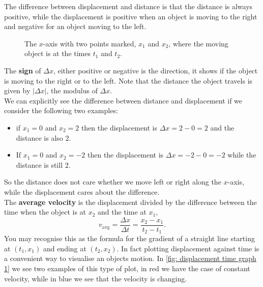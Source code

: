 The difference between displacement and distance is that the distance is always positive, while the displacement is positive when an object is moving to the right and negative for an object moving to the left.\\

\begin{figure}[ht]
    \centering
    \caption{The $x$-axis with two points marked, $x_{1}$ and $x_{2}$, where the moving object is at the times $t_{1}$ and $t_{2}$.}
    \label{fig: x-axis fig2}
\end{figure}

The \textbf{sign} of $\Delta x$, either positive or negative is the direction, it shows if the object is moving to the right or to the left. Note that the distance the object travels is given by $\vert \Delta x\vert$, the modulus of $\Delta x$.\\

We can explicitly see the difference between distance and displacement if we consider the following two examples:
\begin{itemize}
\setlength{\itemsep}{-5pt}
    \item if $x_{1}=0$ and $x_{2}=2$ then the displacement is $\Delta x=2-0=2$ and the distance is also $2$.
    \item If $x_{1}=0$ and $x_{2}=-2$ then the displacement is $\Delta x = -2-0=-2$ while the distance is still $2$.
\end{itemize}
So the distance does not care whether we move left or right along the $x$-axis, while the displacement cares about the difference.\\

The \textbf{average velocity} is the displacement divided by the difference between the time when the object is at $x_{2}$ and the time at $x_{1}$,
\begin{equation}
    v_{\text{avg}}=\frac{\Delta x}{\Delta t}=\frac{x_{2}-x_{1}}{t_{2}-t_{1}}.
    \label{eq: average velocity}
\end{equation}
You may recognise this as the formula for the gradient of a straight line starting at $(t_{1},x_{1})$ and ending at $(t_{2},x_{2})$. In fact plotting displacement against time is a convenient way to visualise an objects motion. In \cref{fig: displacement time graph 1} we see two examples of this type of plot, in red we have the case of constant velocity, while in blue we see that the velocity is changing.\\

